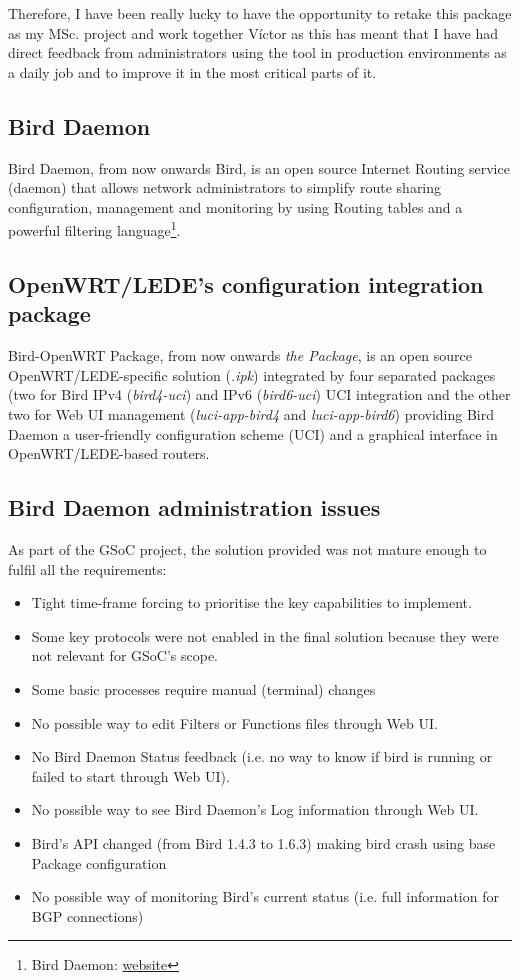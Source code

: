 Therefore, I have been really lucky to have the opportunity to retake this package as my MSc. project and work together Víctor as this has meant that I have had direct feedback from administrators using the tool in production environments as a daily job and to improve it in the most critical parts of it.

\subsection{Bird Daemon}
Bird Daemon, from now onwards Bird, is an open source Internet Routing service (daemon) that allows network administrators to simplify route sharing configuration, management and monitoring by using Routing tables and a powerful filtering language\footnote{Bird Daemon: \href{http://bird.network.cz/}{website}}.

\subsection{OpenWRT/LEDE's configuration integration package}
Bird-OpenWRT Package, from now onwards \textit{the Package}, is an open source OpenWRT/LEDE-specific solution (\textit{.ipk}) integrated by four separated packages (two for Bird IPv4 (\textit{bird4-uci}) and IPv6 (\textit{bird6-uci}) UCI integration and the other two for Web UI management (\textit{luci-app-bird4} and \textit{luci-app-bird6}) providing Bird Daemon a user-friendly configuration scheme (UCI) and a graphical interface in OpenWRT/LEDE-based routers.

\subsection{Bird Daemon administration issues}
\label{subsec:bdai}
As part of the GSoC project, the solution provided was not mature enough to fulfil all the requirements:
\begin{itemize}
    \item Tight time-frame forcing to prioritise the key capabilities to implement.
    \item Some key protocols were not enabled in the final solution because they were not relevant for GSoC's scope.
    \item Some basic processes require manual (terminal) changes
    \item No possible way to edit Filters or Functions files through Web UI.
    \item No Bird Daemon Status feedback (i.e. no way to know if bird is running or failed to start through Web UI).
    \item No possible way to see Bird Daemon's Log information through Web UI.
    \item Bird's API changed (from Bird 1.4.3 to 1.6.3) making bird crash using base Package configuration
    \item No possible way of monitoring Bird's current status (i.e. full information for BGP connections)
\end{itemize}
